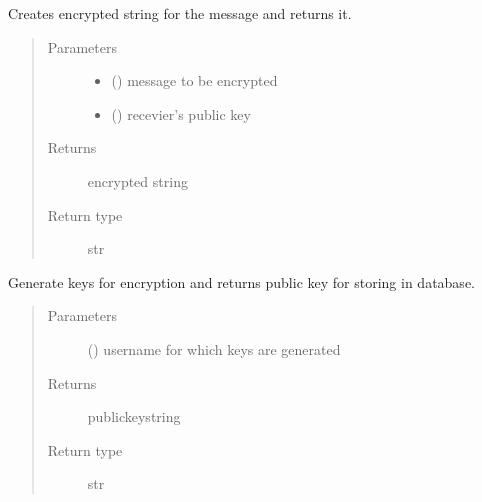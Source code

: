 \documentclass[letterpaper,10pt,english]{sphinxmanual}
\begin{document}
\begin{fulllineitems}
\label{\detokenize{newencrypt:newencrypt.encrypt}}
Creates encrypted string for the message and returns it.
\begin{quote}\begin{description}
\item[{Parameters}] \leavevmode\begin{itemize}
\item {} 
 () \textendash{} message to be encrypted

\item {} 
 () \textendash{} recevier’s public key

\end{itemize}

\item[{Returns}] \leavevmode
encrypted string

\item[{Return type}] \leavevmode
str

\end{description}\end{quote}

\end{fulllineitems}


\begin{fulllineitems}
\label{\detokenize{newencrypt:newencrypt.generatekeys}}
Generate keys for encryption and returns public key for storing in database.
\begin{quote}\begin{description}
\item[{Parameters}] \leavevmode
{} () \textendash{} username for which keys are generated

\item[{Returns}] \leavevmode
publickeystring

\item[{Return type}] \leavevmode
str

\end{description}\end{quote}

\end{fulllineitems}
\end{document}
